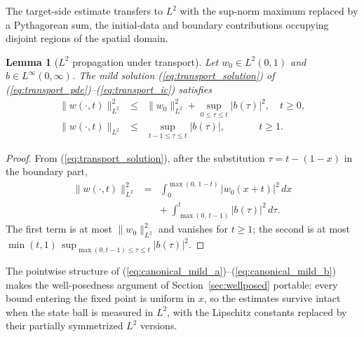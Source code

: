 \documentclass[amsthm]{autart}
\theoremstyle{plain}
\newtheorem{lemma}{Lemma}
\theoremstyle{definition}
\newcommand{\Linf}{L^\infty}
\newcommand{\Ltwo}{L^2}
\begin{document}
The target-side estimate transfers to $\Ltwo$ with the sup-norm maximum replaced by a Pythagorean sum, the initial-data and boundary contributions occupying disjoint regions of the spatial domain.

\begin{lemma}[$\Ltwo$ propagation under transport]\label{lem:transportL2}
Let $w_0 \in \Ltwo(0,1)$ and $b \in \Linf(0,\infty)$. The mild solution (\ref{eq:transport_solution}) of (\ref{eq:transport_pde})--(\ref{eq:transport_ic}) satisfies
\begin{eqnarray}
\|w(\cdot,t)\|_{\Ltwo}^2 &\le& \|w_0\|_{\Ltwo}^2 + \sup_{0 \le \tau \le t}|b(\tau)|^2, \quad t \ge 0, \nonumber \\
\|w(\cdot,t)\|_{\Ltwo} &\le& \sup_{t-1 \le \tau \le t}|b(\tau)|, \qquad\quad\ \  t \ge 1.
\label{eq:transportL2}
\end{eqnarray}
\end{lemma}

\begin{proof}
From (\ref{eq:transport_solution}), after the substitution $\tau = t - (1-x)$ in the boundary part,
\begin{eqnarray}
\|w(\cdot,t)\|_{\Ltwo}^2 &=& \int_0^{\max(0,\,1-t)} |w_0(x+t)|^2\, dx \nonumber \\
&& +\; \int_{\max(0,\,t-1)}^{t} |b(\tau)|^2\, d\tau.
\label{eq:transportL2_split}
\end{eqnarray}
The first term is at most $\|w_0\|_{\Ltwo}^2$ and vanishes for $t \ge 1$; the second is at most $\min(t,1)\, \sup_{\max(0,t-1) \le \tau \le t}|b(\tau)|^2$.
\end{proof}

The pointwise structure of (\ref{eq:canonical_mild_a})--(\ref{eq:canonical_mild_b}) makes the well-posedness argument of Section~\ref{sec:wellposed} portable: every bound entering the fixed point is uniform in $x$, so the estimates survive intact when the state ball is measured in $\Ltwo$, with the Lipschitz constants replaced by their partially symmetrized $\Ltwo$ versions.
\end{document}

